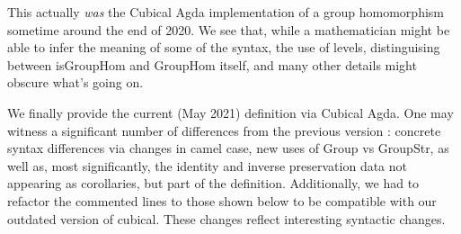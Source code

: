 \begin{code}
\AgdaSymbol{(}\AgdaSpace{}%
\AgdaSymbol{:}\AgdaSpace{}%
\AgdaSpace{}%
\AgdaSymbol{\{}\AgdaSymbol{\})}\AgdaSpace{}%
\AgdaSymbol{:}\AgdaSpace{}%
\AgdaSpace{}%
\AgdaSymbol{(}\AgdaSpace{}%
\AgdaSpace{}%
\AgdaSymbol{)}\AgdaSpace{}%
\<%
\\
\>[2][@{}l@{\AgdaIndent{0}}]%
\>[4]\AgdaSpace{}%
\<%
\\
%
\\[\AgdaEmptyExtraSkip]%
%
\>[4]\<%
\\
\>[4][@{}l@{\AgdaIndent{0}}]%
\>[6]\AgdaSpace{}%
\AgdaSymbol{:}\AgdaSpace{}%
\AgdaSpace{}%
\AgdaSpace{}%
\AgdaSpace{}%
\AgdaSpace{}%
\AgdaSpace{}%
\AgdaSpace{}%
\<%
\\
%
\>[6]\AgdaSpace{}%
\AgdaSymbol{:}\AgdaSpace{}%
\AgdaSpace{}%
\AgdaSpace{}%
\AgdaSpace{}%
\<%
\end{code}
This actually \emph{was} the Cubical Agda implementation of a group homomorphism
sometime around the end of 2020. We see that, while a mathematician might be
able to infer the meaning of some of the syntax, the use of levels,
distinguising between isGroupHom and GroupHom itself, and many other details
might obscure what's going on.

We finally provide the current (May 2021) definition via Cubical Agda. One may
witness a significant number of differences from the previous version : concrete
syntax differences via changes in camel case, new uses of Group vs GroupStr, as
well as, most significantly, the identity and inverse preservation data not
appearing as corollaries, but part of the definition. Additionally, we had to
refactor the commented lines to those shown below to be compatible with our
outdated version of cubical. These changes reflect interesting syntactic
changes.

